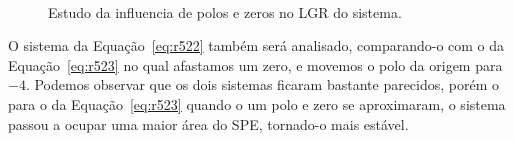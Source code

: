 \documentclass[a4paper]{article}
\begin{document}
\begin{figure}[h]
   \\
   \caption{Estudo da influencia de polos e zeros no LGR do sistema.}
   \label{fig:r521}
\end{figure}

O sistema da Equação~\ref{eq:r522} também será analisado, comparando-o com o
da Equação~\ref{eq:r523} no qual afastamos um zero, e
movemos o polo da origem para $-4$. Podemos observar que os dois sistemas
ficaram bastante parecidos, porém o para o da Equação~\ref{eq:r523} quando
o um polo e zero se aproximaram, o sistema passou a ocupar uma maior
área do SPE, tornado-o mais estável.
\end{document}
